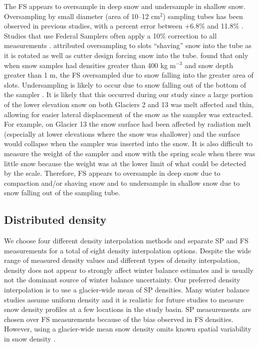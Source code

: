 \documentclass[twocolumn, letterpaper]{igs}
\begin{document}
The FS appears to oversample in deep snow and undersample in shallow snow. Oversampling by small diameter (area of 10--12 cm$^2$) sampling tubes has been observed in previous studies, with a percent error between +6.8\% and 11.8\% \citep{Work1965, Fames1982, Conger2009}. Studies that use Federal Samplers often apply a 10\% correction to all measurements \citep[e.g.][]{Molotch2005}. \cite{Dixon2012} attributed oversampling to slots ``shaving'' snow into the tube as it is rotated as well as cutter design forcing snow into the tube. \cite{Beaumont1963} found that only when snow samples had densities greater than 400 kg m$^{-3}$ and snow depth greater than 1 m, the FS oversampled due to snow falling into the greater area of slots. Undersampling is likely to occur due to snow falling out of the bottom of the sampler \citep{Turcan1975}. It is likely that this occurred during our study since a large portion of the lower elevation snow on both Glaciers 2 and 13 was melt affected and thin, allowing for easier lateral displacement of the snow as the sampler was extracted. For example, on Glacier 13 the snow surface had been affected by radiation melt (especially at lower elevations where the snow was shallower) and the surface would collapse when the sampler was inserted into the snow. It is also difficult to measure the weight of the sampler and snow with the spring scale when there was little snow because the weight was at the lower limit of what could be detected by the scale. Therefore, FS appears to oversample in deep snow due to compaction and/or shaving snow and to undersample in shallow snow due to snow falling out of the sampling tube. 

\subsection{Distributed density}

We choose four different density interpolation methods and separate SP and FS measurements for a total of eight density interpolation options. Despite the wide range of measured density values and different types of density interpolation, density does not appear to strongly affect winter balance estimates and is usually not the dominant source of winter balance uncertainty. Our preferred density interpolation is to use a glacier-wide mean of SP densities. Many winter balance studies assume uniform density \citep[e.g.][]{Elder1991,McGrath2015,Cullen2017} and it is realistic for future studies to measure snow density profiles at a few locations in the study basin. SP measurements are chosen over FS measurements because of the bias observed in FS densities. However, using a glacier-wide mean snow density omits known spatial variability in snow density \citep{Wetlaufer2016}. 
\end{document}
